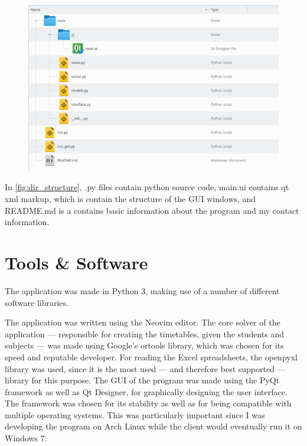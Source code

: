 \documentclass[12pt]{article}
\begin{document}
    \begin{figure}[H]
        \label{fig:dir_structure}
        \includegraphics[width=\textwidth]{directory_structure}
    \end{figure}

    In \autoref{fig:dir_structure}, .py files contain python source code, main.ui contains
    qt xml markup, which is contain the structure of the GUI windows, and README.md is a
    contains basic information about the program and my contact information.

\section{Tools \& Software}
    The application was made in Python 3, making use of a number of different software
    libraries.  

    The application was written using the Neovim \autocite{neovim} editor. The core solver
    of the application --- responsible for creating the timetables, given the students and
    subjects --- was made using Google's ortools \autocite{ortools} library, which was
    chosen for its speed and reputable developer.  For reading the Excel spreadsheets, the
    openpyxl\autocite{openpyxl} library was used, since it is the most used --- and
    therefore best supported --- library for this purpose. The GUI of the program was made
    using the PyQt framework as well as Qt Designer, for graphically designing the user
    interface. The framework was chosen for its stability as well as for being compatible
    with multiple operating systems. This was particularly important since I was developing
    the program on Arch Linux while the client would eventually run it on Windows 7.
\end{document}
